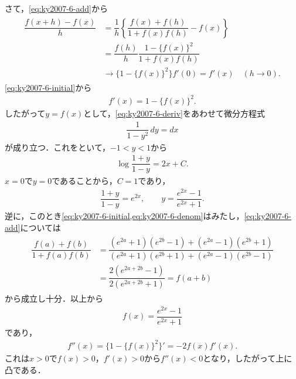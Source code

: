 \documentclass[../main.tex]{subfiles}
\begin{document}
さて，\cref{eq:ky2007-6-add}から
\begin{align}
  \begin{split}
    \dfrac{f(x+h)-f(x)}{h}
    &=\dfrac{1}{h}\left\{\dfrac{f(x)+f(h)}{1+f(x)f(h)}-f(x)\right\}\\
    &=\dfrac{f(h)}{h}\dfrac{1-\{f(x)\}^2}{1+f(x)f(h)}\\
    &\longrightarrow\{1-\{f(x)\}^2\}f'(0)=f'(x)\quad(h\to0).
  \end{split}
\end{align}
\cref{eq:ky2007-6-initial}から
\begin{align}f'(x)=1-\{f(x)\}^2.\label{eq:ky2007-6-deriv}
\end{align}
したがって$y=f(x)$として，\cref{eq:ky2007-6-deriv}をあわせて微分方程式
\begin{align}\dfrac{1}{1-y^2}\,dy=dx
\end{align}
が成り立つ．これをといて，$-1<y<1$から
\begin{align}\log\dfrac{1+y}{1-y}=2x+C.
\end{align}
$x=0$で$y=0$であることから，$C=1$であり，
\begin{align}
  \dfrac{1+y}{1-y}=e^{2x},\qquad y=\dfrac{e^{2x}-1}{e^{2x}+1}.
\end{align}
逆に，このとき\cref{eq:ky2007-6-initial,eq:ky2007-6-denom}はみたし，\cref{eq:ky2007-6-add}については
\begin{align}
  \begin{split}
    \dfrac{f(a)+f(b)}{1+f(a)f(b)}
    &=\dfrac{(e^{2a}+1)(e^{2b}-1)+(e^{2a}-1)(e^{2b}+1)}{(e^{2a}+1)(e^{2b}+1)+(e^{2a}-1)(e^{2b}-1)}\\
    &=\dfrac{2(e^{2a+2b}-1)}{2(e^{2a+2b}+1)}=f(a+b)
  \end{split}
\end{align}
から成立し十分．以上から
\begin{align}f(x)=\dfrac{e^{2x}-1}{e^{2x}+1}
\end{align}
であり，
\begin{align}f''(x)=\{1-\{f(x)\}^2\}'=-2f(x)f'(x).
\end{align}
これは$x>0$で$f(x)>0$，$f'(x)>0$から$f''(x)<0$となり，したがって上に凸である．
\newpage
\end{document}
